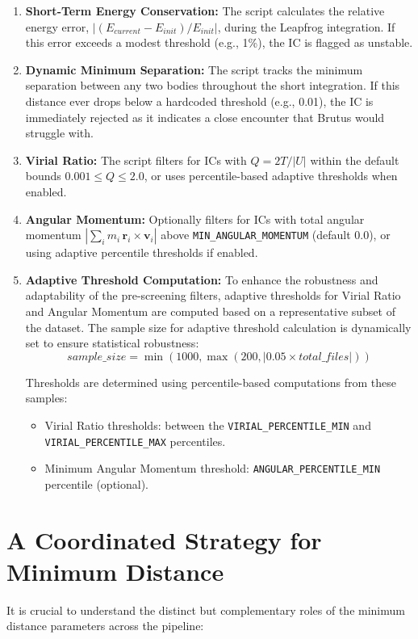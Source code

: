 \documentclass{article}
\begin{document}
\begin{enumerate}
    \item \textbf{Short-Term Energy Conservation:} The script calculates the relative energy error, $|(E_{current} - E_{init}) / E_{init}|$, during the Leapfrog integration. If this error exceeds a modest threshold (e.g., 1\%), the IC is flagged as unstable.
    
    \item \textbf{Dynamic Minimum Separation:} The script tracks the minimum separation between any two bodies throughout the short integration. If this distance ever drops below a hardcoded threshold (e.g., 0.01), the IC is immediately rejected as it indicates a close encounter that Brutus would struggle with.
    
    \item \textbf{Virial Ratio:} The script filters for ICs with $Q = 2T/|U|$ within the default bounds $0.001 \le Q \le 2.0$, or uses percentile-based adaptive thresholds when enabled.
    
    \item \textbf{Angular Momentum:} Optionally filters for ICs with total angular momentum $|\sum_i m_i\,\mathbf r_i \times \mathbf v_i|$ above \texttt{MIN\_ANGULAR\_MOMENTUM} (default 0.0), or using adaptive percentile thresholds if enabled.

    \item \textbf{Adaptive Threshold Computation:} 
    To enhance the robustness and adaptability of the pre-screening filters, adaptive thresholds for Virial Ratio and Angular Momentum are computed based on a representative subset of the dataset. The sample size for adaptive threshold calculation is dynamically set to ensure statistical robustness:
    $$
    sample\_size = \min(1000, \max(200, \lvert 0.05 \times total\_files \rvert))
    $$
    
    Thresholds are determined using percentile-based computations from these samples:
    \begin{itemize}
        \item Virial Ratio thresholds: between the \texttt{VIRIAL\_PERCENTILE\_MIN} and \texttt{VIRIAL\_PERCENTILE\_MAX} percentiles.
        \item Minimum Angular Momentum threshold: \texttt{ANGULAR\_PERCENTILE\_MIN} percentile (optional).
    \end{itemize}
\end{enumerate}

\section{A Coordinated Strategy for Minimum Distance}
It is crucial to understand the distinct but complementary roles of the minimum distance parameters across the pipeline:
\end{document}
